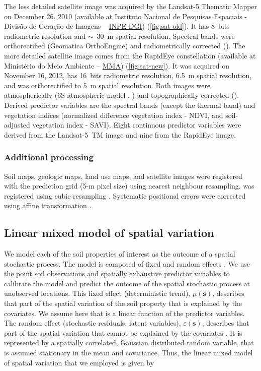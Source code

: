 The less detailed satellite image was acquired by the Landsat-5 Thematic Mapper
on December 26, 2010 (available at Instituto Nacional de Pesquisas Espaciais - 
Divisão de Geração de Imagens -- \href{http://www.dgi.inpe.br/CDSR/}{INPE-DGI})
(\autoref{fig:sat-old}). It has 8~bits radiometric resolution and $\sim$~30~m 
spatial resolution. Spectral bands were orthorectified (Geomatica\textregistered{}
OrthoEngine\textregistered{}) and radiometrically corrected ().
The more detailed satellite image comes from the RapidEye constellation 
(available at Ministério do Meio Ambiente -- 
\href{http://geocatalogo.ibama.gov.br/}{MMA}) (\autoref{fig:sat-new}). It was 
acquired on November 16, 2012, has 16~bits radiometric resolution, 6.5~m spatial
resolution, and was orthorectified to 5~m spatial resolution. Both images were 
atmospherically (6S atmospheric model \citep{VermoteEtAl1997}, )
and topographically corrected (). Derived predictor variables
are the spectral bands (except the thermal band) and vegetation indices 
(normalized difference vegetation index - NDVI, and soil-adjusted vegetation 
index - SAVI). Eight continuous predictor variables were derived from the 
Landsat-5~TM image and nine from the RapidEye image.

\subsubsection*{Additional processing}
\label{subsubsec:sources-processing}

Soil maps, geologic maps, land use maps, and satellite images were registered 
with the prediction grid (5-m pixel size) using nearest neighbour resampling. 
\demOld{} was registered using cubic resampling \citep{Samuel-RosaEtAl2013c}. 
Systematic positional errors were corrected using affine transformation 
\citep{Samuel-RosaEtAl2014}.

\subsection{Linear mixed model of spatial variation}
\label{subsec:lmm}

We model each of the soil properties of interest as the outcome of a spatial 
stochastic process. The model is composed of fixed and random effects 
\citep{HeuvelinkEtAl2001, LarkEtAl2006}. We use the point soil observations and 
spatially exhaustive predictor variables to calibrate the model and predict the
outcome of the spatial stochastic process at unobserved locations. This fixed 
effect (deterministic trend), $\mu(\textbf{s})$, describes that part of the 
spatial variation of the soil property that is explained by the covariates. We 
assume here that is a linear function of the predictor variables. The random 
effect (stochastic residuals, latent variables), $\varepsilon(\textbf{s})$, 
describes that part of the spatial variation that cannot be explained by the 
covariates \citep{Cressie1993}. It is represented by a spatially correlated, 
Gaussian distributed random variable, that is assumed stationary in the mean 
and covariance. Thus, the linear mixed model of spatial variation that we 
employed is given by


